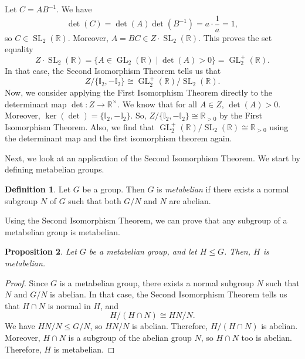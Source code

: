 \documentclass[a4paper, openany]{memoir}
\theoremstyle{definition}
\newtheorem{definition}{Definition}[section]
\theoremstyle{plain}
\newtheorem{proposition}[definition]{Proposition}
\begin{document}
Let $C = AB^{-1}$. We have
\[\det(C) = \det(A) \det(B^{-1}) = a \cdot \frac{1}{a} = 1,\]
so $C \in \operatorname{SL}_2(\mathbb{R})$. Moreover, $A = BC \in Z \cdot \operatorname{SL}_2(\mathbb{R})$. This proves the set equality
\[Z \cdot \operatorname{SL}_2(\mathbb{R}) = \{A \in \operatorname{GL}_2(\mathbb{R}) \mid \det (A) > 0\} = \operatorname{GL}_2^+ (\mathbb{R}).\]
In that case, the Second Isomorphism Theorem tells us that
\[Z/\{\mathbb{I}_2, -\mathbb{I}_2\} \cong \operatorname{GL}_2^+(\mathbb{R})/ \operatorname{SL}_2(\mathbb{R}).\]
Now, we consider applying the First Isomorphism Theorem directly to the determinant map $\det: Z \to \mathbb{R}^\times$. We know that for all $A \in Z$, $\det(A) > 0$. Moreover, $\ker (\det) = \{\mathbb{I}_2, -\mathbb{I}_2\}$. So, $Z/\{\mathbb{I}_2, -\mathbb{I}_2\} \cong \mathbb{R}_{> 0}$ by the First Isomorphism Theorem. Also, we find that $\operatorname{GL}_2^+(\mathbb{R})/\operatorname{SL}_2(\mathbb{R}) \cong \mathbb{R}_{> 0}$ using the determinant map and the first isomorphism theorem again.

Next, we look at an application of the Second Isomorphism Theorem. We start by defining metabelian groups.
\begin{definition}
Let $G$ be a group. Then $G$ is \emph{metabelian} if there exists a normal subgroup $N$ of $G$ such that both $G/N$ and $N$ are abelian.
\end{definition}
\noindent Using the Second Isomorphism Theorem, we can prove that any subgroup of a metabelian group is metabelian.
\begin{proposition}
Let $G$ be a metabelian group, and let $H \leqslant G$. Then, $H$ is metabelian.
\end{proposition}
\begin{proof}
Since $G$ is a metabelian group, there exists a normal subgroup $N$ such that $N$ and $G/N$ is abelian. In that case, the Second Isomorphism Theorem tells us that $H \cap N$ is normal in $H$, and
\[H/(H \cap N) \cong HN/N.\]
We have $HN/N \leqslant G/N$, so $HN/N$ is abelian. Therefore, $H/(H \cap N)$ is abelian. Moreover, $H \cap N$ is a subgroup of the abelian group $N$, so $H \cap N$ too is abelian. Therefore, $H$ is metabelian.
\end{proof}
\end{document}
